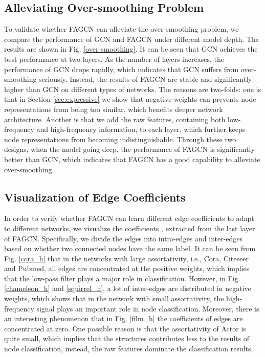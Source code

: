 \documentclass[letterpaper]{article} \usepackage{aaai21}  \usepackage{times}  \usepackage{helvet} \usepackage{courier}  \usepackage[hyphens]{url}  \usepackage{graphicx} \urlstyle{rm} \def\UrlFont{\rm}  \usepackage{natbib}  \usepackage{caption} \frenchspacing  \setlength{\pdfpagewidth}{8.5in}  \setlength{\pdfpageheight}{11in}
\begin{document}
\subsection{Alleviating Over-smoothing Problem}
To validate whether FAGCN can alleviate the over-smoothing problem, we compare the performance of GCN and FAGCN under different model depth. The results are shown in Fig. \ref{over-smoothing}. It can be seen that GCN achieves the best performance at two layers. As the number of layers increases, the performance of GCN drops rapidly, which indicates that GCN suffers from over-smoothing seriously. Instead, the results of FAGCN are stable and significantly higher than GCN on different types of networks. The reasons are two-folds: one is that in Section \ref{sec:expressive} we show that negative weights can prevents node representations from being too similar, which benefits deeper network architecture. Another is that we add the raw features, containing both low-frequency and high-frequency information, to each layer, which further keeps node representations from becoming indistinguishable. Through these two designs, when the model going deep, the performance of FAGCN is significantly better than GCN, which indicates that FAGCN has a good capability to alleviate over-smoothing.





\subsection{Visualization of Edge Coefficients}
\label{visualexperiment}

In order to verify whether FAGCN can learn different edge coefficients to adapt to different networks, we visualize the coefficients , extracted from the last layer of FAGCN.
Specifically, we divide the edges into intra-edges and inter-edges based on whether two connected nodes have the same label. 
It can be seen from Fig. \ref{cora_h} that in the networks with large assortativity, i.e., Cora, Citeseer and Pubmed, all edges are concentrated at the positive weights, which implies that the low-pass filter plays a major role in classification.
However, in Fig. \ref{chameleon_h} and \ref{squirrel_h}, a lot of inter-edges are distributed in negative weights, which shows that in the network with small assortativity, the high-frequency signal plays an important role in node classification.
Moreover, there is an interesting phenomenon that in Fig. \ref{film_h} the coefficients of edges are concentrated at zero. One possible reason is that the assortativity of Actor is quite small, which implies that the structures contributes less to the results of node classification, instead, the raw features dominate the classification results.
\end{document}
